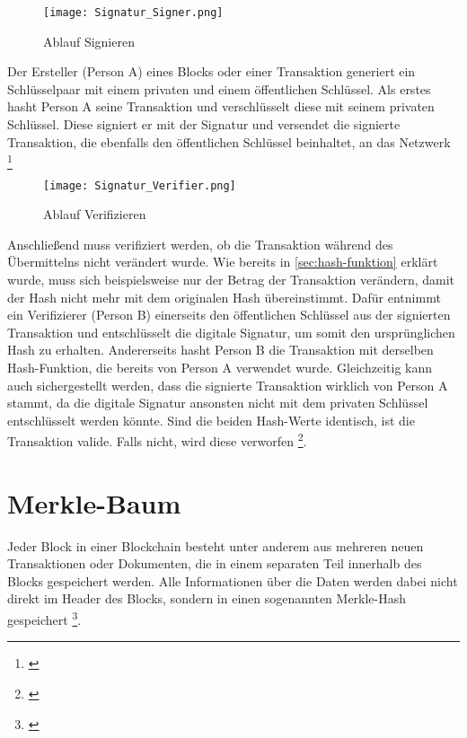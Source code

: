 \begin{figure}[h]
    \begin{centering}
        \texttt{[image: Signatur\_Signer.png]}
        \caption[Ablauf Signieren]{Ablauf Signieren \footnotemark}
        \label{fig:ablauf-signieren}
    \end{centering}
\end{figure}

Der Ersteller (Person A) eines Blocks oder einer Transaktion generiert ein Schlüsselpaar mit einem privaten und einem öffentlichen Schlüssel. Als erstes hasht Person A seine Transaktion und verschlüsselt diese mit seinem privaten Schlüssel. Diese signiert er mit der Signatur und versendet die signierte Transaktion, die ebenfalls den öffentlichen Schlüssel beinhaltet, an das Netzwerk \footnote{\parencite[vgl.][]{entwickler.de.NaN}}

\begin{figure}[h]
    \begin{centering}
        \texttt{[image: Signatur\_Verifier.png]}
        \caption[Ablauf Verifizieren]{Ablauf Verifizieren \footnotemark}
        \label{fig:ablauf-verifizieren}
    \end{centering}
\end{figure}

Anschließend muss verifiziert werden, ob die Transaktion während des Übermittelns nicht verändert wurde. Wie bereits in \vref*{sec:hash-funktion} erklärt wurde, muss sich beispielsweise nur der Betrag der Transaktion verändern, damit der Hash nicht mehr mit dem originalen Hash übereinstimmt. Dafür entnimmt ein Verifizierer (Person B) einerseits den öffentlichen Schlüssel aus der signierten Transaktion und entschlüsselt die digitale Signatur, um somit den ursprünglichen Hash zu erhalten. Andererseits hasht Person B die Transaktion mit derselben Hash-Funktion, die bereits von Person A verwendet wurde. Gleichzeitig kann auch sichergestellt werden, dass die signierte Transaktion wirklich von Person A stammt, da die digitale Signatur ansonsten nicht mit dem privaten Schlüssel entschlüsselt werden könnte. Sind die beiden Hash-Werte identisch, ist die Transaktion valide. Falls nicht, wird diese verworfen \footnote{\parencite[vgl.][]{entwickler.de.NaN}}.

\section{Merkle-Baum}\label{sec:merkle-baum}
Jeder Block in einer Blockchain besteht unter anderem aus mehreren neuen Transaktionen oder Dokumenten, die in einem separaten Teil innerhalb des Blocks gespeichert werden. Alle Informationen über die Daten werden dabei nicht direkt im Header des Blocks, sondern in einen sogenannten Merkle-Hash gespeichert \footnote{\parencite[vgl.][S. 137]{Bruhl.2017}}.

